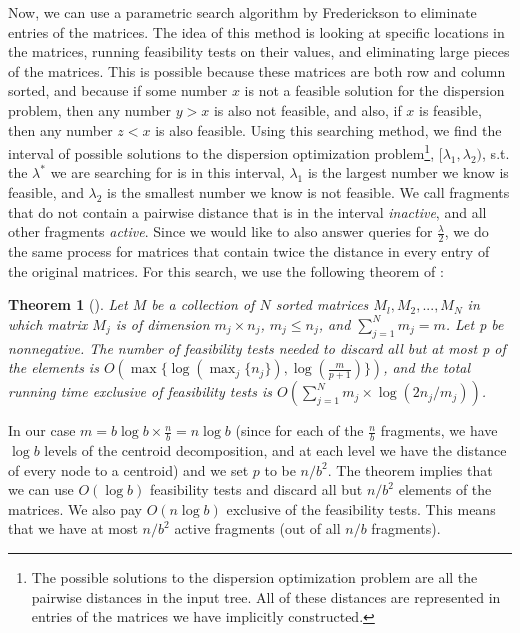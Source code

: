 \documentclass[11pt,a4paper]{article}
\newtheorem{theorem}{Theorem}[section]
\theoremstyle{definition}
\theoremstyle{remark}
\begin{document}
Now, we can use a parametric search algorithm by Frederickson to eliminate entries of the matrices. The idea of this method is looking at specific locations in the matrices, running feasibility tests on their values, and eliminating large pieces of the matrices. This is possible because these matrices are both row and column sorted, and because if some number $x$ is not a feasible solution for the dispersion problem, then any number $y>x$ is also not feasible, and also, if $x$ is feasible, then any number $z<x$ is also feasible. Using this searching method, we find the interval of possible solutions to the dispersion optimization problem\footnote{The possible solutions to the dispersion optimization problem are all the pairwise distances in the input tree. All of these distances are represented in entries of the matrices we have implicitly constructed.}, $[\lambda_1,\lambda_2)$, s.t. the $\lambda^*$ we are searching for is in this interval, $\lambda_1$ is the largest number we know is feasible, and $\lambda_2$ is the smallest number we know is not feasible. We call fragments that do not contain a pairwise distance that is in the interval \textit{inactive}, and all other fragments \textit{active}. Since we would like to also answer queries for $\frac{\lambda}{2}$, we do the same process for matrices that contain twice the distance in every entry of the original matrices.
For this search, we use the following theorem of \cite{Frederickson1991}:
\begin{theorem}[\cite{Frederickson1991}]\label{Frederickson's theorem}
Let $M$ be a collection of $N$ sorted matrices ${M_l, M_2, . . . , M_N}$ in which matrix $M_j$ is of dimension $m_j \times n_j$, $m_j \leq n_j$, and $\sum_{j=1}^{N} m_j = m$.
Let p be nonnegative. The number of feasibility tests needed to discard all but at most p of the elements is $O(\max \lbrace \log(\max_{j} \lbrace n_j \rbrace), \log(\frac{m}{p+1}) \rbrace)$, and the total running time exclusive of feasibility tests is $O(\sum_{j=1}^{N} m_j \times \log (2n_j/m_j))$.
\end{theorem}
In our case $m=b \log b \times \frac{n}{b} = n \log b$ (since for each of the $\frac{n}{b}$ fragments, we have $\log b$ levels of the centroid decomposition, and at each level we have the distance of every node to a centroid) and we set $p$ to be $n/b^2$. The theorem implies that we can use $O(\log b)$ feasibility tests and discard all but $n/b^2$ elements of the matrices. We also pay $O(n \log b)$ exclusive of the feasibility tests. This means that we have at most $n/b^2$ active fragments (out of all $n/b$ fragments). 
\end{document}
